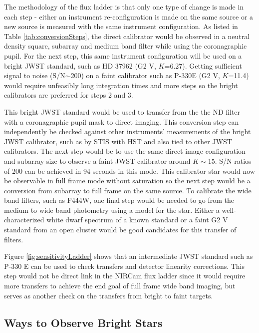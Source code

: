 \documentclass{aastex6}
\begin{document}
The methodology of the flux ladder is that only one type of change is made in each step - either an instrument re-configuration is made on the same source or a new source is measured with the same instrument configuration.
As listed in Table \ref{tab:conversionSteps}, the direct calibrator would be observed in a neutral density square, subarray and medium band filter while using the coronagraphic pupil.
For the next step, this same instrument configuration will be used on a bright JWST standard, such as HD 37962 (G2 V, $K$=6.27).
Getting sufficient signal to noise (S/N$\sim$200) on a faint calibrator such as P-330E (G2 V, $K$=11.4) would require unfeasibly long integration times and more steps so the bright calibrators are preferred for steps 2 and 3.

This bright JWST standard would be used to transfer from the the ND filter with a coronagraphic pupil mask to direct imaging.
This conversion step can independently be checked against other instruments' measurements of the bright JWST calibrator, such as by STIS with HST and also tied to other JWST calibrators.
The next step would be to use the same direct image configuration and subarray size to observe a faint JWST calibrator around $K \sim$15.
S/N ratios of 200 can be achieved in 94 seconds in this mode.
This calibrator star would now be observable in full frame mode without saturation so the next step would be a conversion from subarray to full frame on the same source.
To calibrate the wide band filters, such as F444W, one final step would be needed to go from the medium to wide band photometry using a model for the star.
Either a well-characterized white dwarf spectrum of a known standard or a faint G2 V standard from an open cluster would be good candidates for this transfer of filters.

Figure \ref{fig:sensitivityLadder} shows that an intermediate JWST standard such as P-330 E can be used to check transfers and detector linearity corrections.
This step would not be direct link in the NIRCam flux ladder since it would require more transfers to achieve the end goal of full frame wide band imaging, but serves as another check on the transfers from bright to faint targets.

\subsection{Ways to Observe Bright Stars}\label{sec:brightStarMode}
\end{document}
